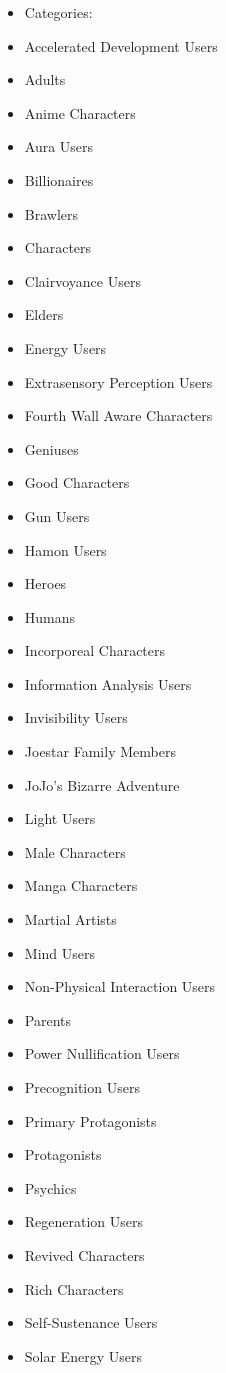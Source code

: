 \documentclass[a4paper,12pt]{article}
\begin{document}
\begin{itemize}
\item Categories:
\item Accelerated Development Users
\item Adults
\item Anime Characters
\item Aura Users
\item Billionaires
\item Brawlers
\item Characters
\item Clairvoyance Users
\item Elders
\item Energy Users
\item Extrasensory Perception Users
\item Fourth Wall Aware Characters
\item Geniuses
\item Good Characters
\item Gun Users
\item Hamon Users
\item Heroes
\item Humans
\item Incorporeal Characters
\item Information Analysis Users
\item Invisibility Users
\item Joestar Family Members
\item JoJo's Bizarre Adventure
\item Light Users
\item Male Characters
\item Manga Characters
\item Martial Artists
\item Mind Users
\item Non-Physical Interaction Users
\item Parents
\item Power Nullification Users
\item Precognition Users
\item Primary Protagonists
\item Protagonists
\item Psychics
\item Regeneration Users
\item Revived Characters
\item Rich Characters
\item Self-Sustenance Users
\item Solar Energy Users

\end{itemize}
\end{document}
